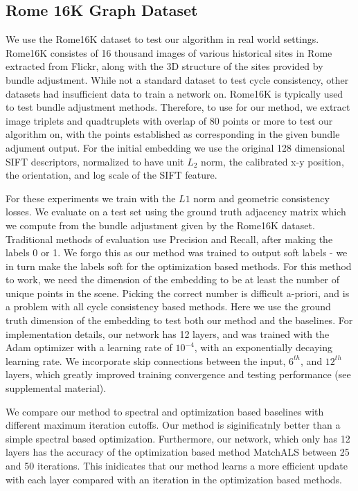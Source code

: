 \documentclass[10pt,twocolumn,letterpaper]{article}
\begin{document}
\subsection{Rome 16K Graph Dataset}
We  use the Rome16K dataset \cite{li2010location} to test our algorithm in real world settings.
Rome16K consistes of 16 thousand images of various historical sites in Rome extracted from Flickr, along with the 3D structure of the sites provided by bundle adjustment.
While not a standard dataset to test cycle consistency, other datasets had insufficient data to train a network on.
Rome16K is typically used to test bundle adjustment methods.
Therefore, to use for our method, we extract image triplets and quadtruplets with overlap of 80 points or more to test our algorithm on, with the points established as corresponding in the given bundle adjument output.
For the initial embedding we use the original 128 dimensional SIFT descriptors, normalized to have unit $L_2$ norm, the calibrated x-y position, the orientation, and log scale of the SIFT feature.

For these experiments we train with the $L1$ norm and geometric consistency losses.
We evaluate on a test set using the ground truth adjacency matrix which we compute from the bundle adjustment given by the Rome16K dataset.
Traditional methods of evaluation use Precision and Recall, after making the labels 0 or 1.
We forgo this as our method was trained to output soft labels - we in turn make the labels soft for the optimization based methods.
For this method to work, we need the dimension of the embedding to be at least the number of unique points in the scene.
Picking the correct number is difficult a-priori, and is a problem with all cycle consistency based methods.
Here we use the ground truth dimension of the embedding to test both our method and the baselines.
For implementation details, our network has 12 layers, and was trained with the Adam optimizer \cite{kingma2014adam} with a learning rate of $10^{-4}$, with an exponentially decaying learning rate. We incorporate skip connections between the input, $6^{th}$, and $12^{th}$ layers, which greatly improved training convergence and testing performance (see supplemental material). 

We compare our method to spectral and optimization based baselines with different maximum iteration cutoffs. Our method is siginificatnly better than a simple spectral based optimization. Furthermore, our network, which only has 12 layers has the accuracy of the optimization based method MatchALS \cite{zhou2015multi} between 25 and 50 iterations. This inidicates that our method learns a more efficient update with each layer compared with an iteration in the optimization based methods.
\end{document}
